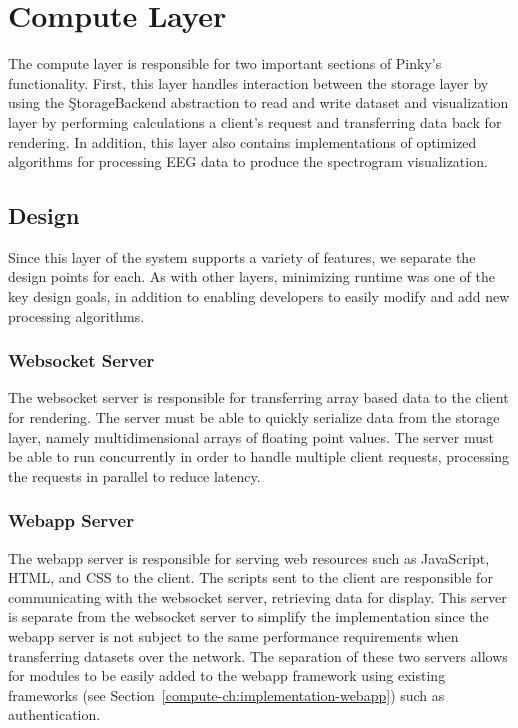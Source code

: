 \chapter{Compute Layer}\label{compute-ch}

The compute layer is responsible for two important sections of Pinky's
functionality. First, this layer handles interaction between the storage layer
by using the \c{StorageBackend} abstraction to read and write dataset and
visualization layer by performing calculations a client's request and
transferring data back for rendering. In addition, this layer also contains
implementations of optimized algorithms for processing EEG data to produce the
spectrogram visualization.

\section{Design}

Since this layer of the system supports a variety of features, we separate the
design points for each. As with other layers, minimizing runtime was one of the
key design goals, in addition to enabling developers to easily modify and add
new processing algorithms.

\subsection{Websocket Server}

The websocket server is responsible for transferring array based data to the
client for rendering. The server must be able to quickly serialize data from
the storage layer, namely multidimensional arrays of floating point values. The
server must be able to run concurrently in order to handle multiple client
requests, processing the requests in parallel to reduce latency.

\subsection{Webapp Server}

The webapp server is responsible for serving web resources such as JavaScript,
HTML, and CSS to the client. The scripts sent to the client are responsible for
communicating with the websocket server, retrieving data for display. This
server is separate from the websocket server to simplify the implementation
since the webapp server is not subject to the same performance requirements
when transferring datasets over the network. The separation of these two
servers allows for modules to be easily added to the webapp framework using
existing frameworks (see Section~\ref{compute-ch:implementation-webapp}) such
as authentication.

